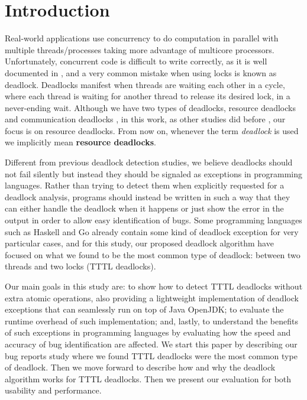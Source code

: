 \section{Introduction}

Real-world applications use concurrency to do computation in parallel with multiple threads/processes taking more advantage of multicore processors. Unfortunately, concurrent code is difficult to write correctly, as it is well documented in \cite{lu}, and a very common mistake when using locks is known as deadlock.
Deadlocks manifest when threads are waiting each other in a cycle, where each thread is waiting for another thread to release its desired lock, in a never-ending wait.
Although we have two types of deadlocks, resource deadlocks and communication deadlocks \cite{singhal} \cite{knapp}, in this work, as other studies did before \cite{mcsdk} \cite{magicfuzzer}, our focus is on resource deadlocks. From now on, whenever the term \emph{deadlock} is used we implicitly mean {\bf resource deadlocks}.

Different from previous deadlock detection studies, we believe deadlocks should not fail silently but instead they should be signaled as exceptions in programming languages. Rather than trying to detect them when explicitly requested for a deadlock analysis, programs should instead be written in such a way that they can either handle the deadlock when it happens or just show the error in the output in order to allow easy identification of bugs. Some programming languages such as Haskell and Go already contain some kind of deadlock exception for very particular cases, and for this study, our proposed deadlock algorithm have focused on what we found to be the most common type of deadlock: between two threads and two locks (TTTL deadlocks).

Our main goals in this study are: to show how to detect TTTL deadlocks without extra atomic operations, also providing a lightweight implementation of deadlock exceptions that can seamlessly run on top of Java OpenJDK; to evaluate the runtime overhead of such implementation; and, lastly, to understand the benefits of such exceptions in programming languages by evaluating how the speed and accuracy of bug identification are affected. We start this paper by describing our bug reports study where we found TTTL deadlocks were the most common type of deadlock. Then we move forward to describe how and why the deadlock algorithm works for TTTL deadlocks. Then we present our evaluation for both usability and performance.





